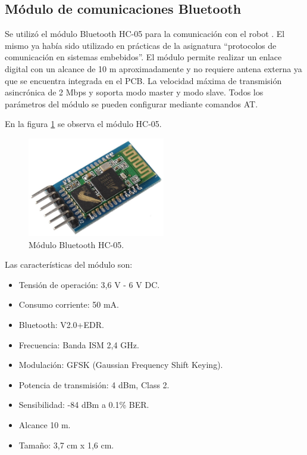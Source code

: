 \subsection{Módulo de comunicaciones Bluetooth}


Se utilizó el módulo Bluetooth HC-05 para la comunicación con el robot \citep{HC05}. El mismo ya había sido utilizado en  prácticas de la asignatura “protocolos de comunicación en sistemas embebidos”.
El módulo permite realizar un enlace digital con un alcance de 10 m aproximadamente y no requiere antena externa ya que se encuentra integrada en el PCB. La velocidad máxima de transmisión asincrónica de 2 Mbps y soporta modo master y modo slave.
Todos los parámetros del módulo se pueden configurar mediante comandos AT. 

En la figura \ref{fig:moduloHC05} se observa el módulo HC-05.


\begin{figure}[h]
	\centering
	\includegraphics[width=6cm]{./Figures/HC05.jpeg}
	\caption{Módulo Bluetooth HC-05\protect\footnotemark.}
	\label{fig:moduloHC05}
\end{figure}



Las características del módulo son:
\begin{itemize}
	\item Tensión de operación: 3,6 V - 6 V DC.
	\item Consumo corriente: 50 mA.
	\item Bluetooth: V2.0+EDR.
	\item Frecuencia: Banda ISM 2,4 GHz.
	\item Modulación: GFSK (Gaussian Frequency Shift Keying).
	\item Potencia de transmisión: 4 dBm, Class 2.
	\item Sensibilidad: -84 dBm a 0.1\% BER.
	\item Alcance 10 m.
	\item Tamaño: 3,7 cm x 1,6 cm.
\end{itemize}

